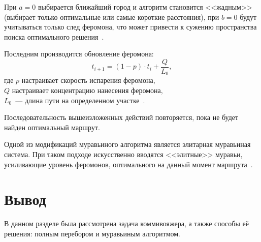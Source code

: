 При $a = 0$ выбирается ближайший город и алгоритм становится <<жадным>> (выбирает только оптимальные или самые короткие расстояния), при $b = 0$ будут учитываться только след феромона, что может привести к сужению пространства поиска оптимального решения~\cite{ants-alg}. 

Последним производится обновление феромона:
\begin{equation}
	t_{i+1} = (1 - p) \cdot t_i + \frac{Q}{L_0},
\end{equation}
где $p$ настраивает скорость испарения феромона,
\\ $Q$ настраивает концентрацию нанесения феромона,
\\ $L_0$~--- длина пути на определенном участке~\cite{ants-alg}.

Последовательность вышеизложенных действий повторяется, пока не будет найден оптимальный маршрут.

Одной из модификаций муравьиного алгоритма является элитарная муравьиная система.
При таком подходе искусственно вводятся <<элитные>> муравьи, усиливающие уровень феромонов, оптимального на данный момент маршрута~\cite{elite-ants-alg}.

\section*{Вывод}
В данном разделе была рассмотрена задача коммивояжера, а также способы её решения: полным перебором и муравьиным алгоритмом.